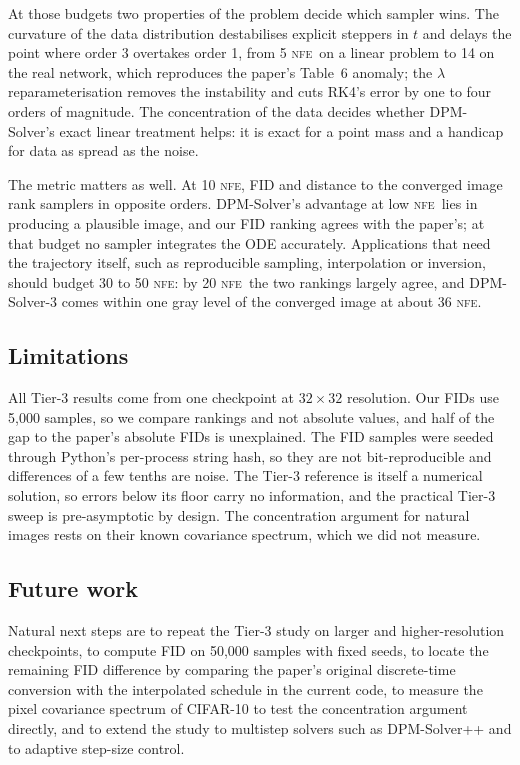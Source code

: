 \documentclass[sigconf]{acmart}
\newcommand{\NFE}{\textsc{nfe}}
\newcommand{\lam}{\lambda}
\begin{document}
At those budgets two properties of the problem decide which sampler wins. The
curvature of the data distribution destabilises explicit steppers in $t$ and delays
the point where order 3 overtakes order 1, from 5 \NFE\ on a linear problem to 14 on
the real network, which reproduces the paper's Table~6 anomaly; the $\lam$
reparameterisation removes the instability and cuts RK4's error by one to four orders
of magnitude. The concentration of the data decides whether DPM-Solver's exact linear
treatment helps: it is exact for a point mass and a handicap for data as spread as the
noise.

The metric matters as well. At 10 \NFE, FID and distance to the converged image rank
samplers in opposite orders. DPM-Solver's advantage at low \NFE\ lies in producing a
plausible image, and our FID ranking agrees with the paper's; at that budget no sampler
integrates the ODE accurately. Applications that need the trajectory itself,
such as reproducible sampling, interpolation or inversion, should budget 30 to 50
\NFE: by 20 \NFE\ the two rankings largely agree, and DPM-Solver-3 comes within one
gray level of the converged image at about 36 \NFE.

\subsection{Limitations}

All Tier-3 results come from one checkpoint at $32\times32$ resolution. Our FIDs use
5,000 samples, so we compare rankings and not absolute values, and half of the gap to
the paper's absolute FIDs is unexplained. The FID samples were seeded through Python's
per-process string hash, so they are not bit-reproducible and differences of a few
tenths are noise. The Tier-3 reference is itself a numerical solution, so errors below
its floor carry no information, and the practical Tier-3 sweep is pre-asymptotic by
design. The concentration argument for natural images rests on their known covariance
spectrum, which we did not measure.

\subsection{Future work}

Natural next steps are to repeat the Tier-3 study on larger and higher-resolution
checkpoints, to compute FID on 50,000 samples with fixed seeds, to locate the
remaining FID difference by comparing the paper's original discrete-time conversion
with the interpolated schedule in the current code, to measure the pixel covariance
spectrum of CIFAR-10 to test the concentration argument directly, and to extend the
study to multistep solvers such as DPM-Solver++ and to adaptive step-size control.
\end{document}

